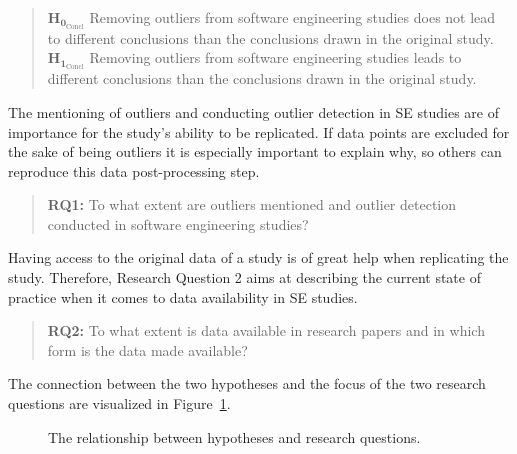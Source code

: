 \begin{quote}
$\mathbf{H_{0_{\mathrm{Concl}}}}$ Removing outliers from software engineering studies does not lead to different conclusions than the conclusions drawn in the original study. 
\\$\mathbf{H_{1_{\mathrm{Concl}}}}$  Removing outliers from software engineering studies leads to different conclusions than the conclusions drawn in the original study.
\end{quote}


The mentioning of outliers and conducting outlier detection in SE studies are of importance for the study's ability to be replicated. If data points are excluded for the sake of being outliers it is especially important to explain why, so others can reproduce this data post-processing step.


\begin{quote}
\textbf{RQ1:} To what extent are outliers mentioned and outlier detection conducted in software engineering studies?
\end{quote}


Having access to the original data of a study is of great help when replicating the study. Therefore, Research Question 2 aims at describing the current state of practice when it comes to data availability in SE studies. 


\begin{quote}
\textbf{RQ2:} To what extent is data available in research papers and in which form is the data made available?
\end{quote}


The connection between the two hypotheses and the focus of the two research questions are visualized in Figure~\ref{fig:intro-hypo}.


\begin{figure}
\centering
\caption{The relationship between hypotheses and research questions. }
\label{fig:intro-hypo}

\end{figure}
